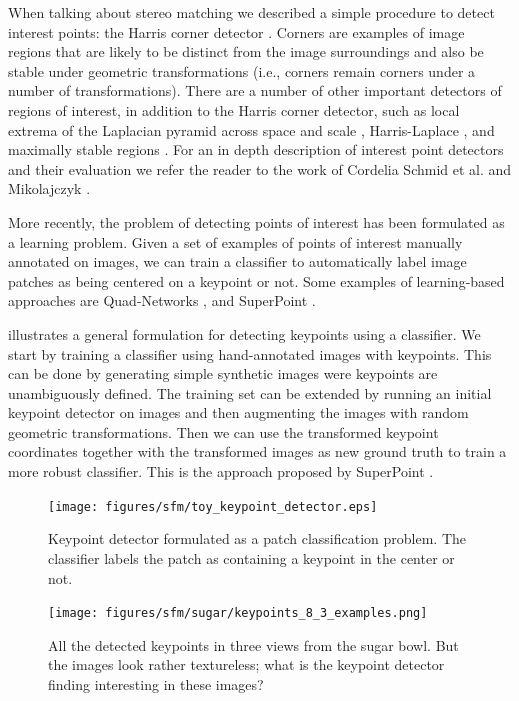 When talking about stereo matching we described a simple procedure to detect interest points: the Harris corner detector \cite{Harris88}. Corners are examples of image regions that are likely to be distinct from the image surroundings and also be stable under geometric transformations (i.e., corners remain corners under a number of transformations).
There are a number of other important detectors of regions of interest, in addition to the Harris corner detector, such as local extrema of the Laplacian pyramid across space and scale \cite{Mikolajczyk2002,Lowe04}, Harris-Laplace \cite{Mikolajczyk2001}, and maximally stable regions \cite{Matas2004}.  For an in depth description of interest point detectors and their evaluation we refer the reader to the work of Cordelia Schmid et al. \cite{Schmid2000} and Mikolajczyk \cite{Mikolajczyk2002}.


More recently, the problem of detecting points of interest has been formulated as a learning problem. Given a set of examples of points of interest manually annotated on images, we can train a classifier to automatically label image patches as being centered on a keypoint or not. Some examples of learning-based approaches are Quad-Networks \cite{Savinov2017}, and SuperPoint \cite{DeTone2018}.


\Fig{\ref{fig:sfm:toy_keypoint_detector}} illustrates a general formulation for detecting keypoints using a classifier. We start by training a classifier using hand-annotated images with keypoints. This can be done by generating simple synthetic images were keypoints are unambiguously defined. The training set can be extended by running an initial keypoint detector on images and then augmenting the images with random geometric transformations. Then we can use the transformed keypoint coordinates together with the transformed images as new ground truth to train a more robust classifier. This is the approach proposed by SuperPoint \cite{DeTone2018}.


\begin{figure}[t]
    \centerline{
        \texttt{[image: figures/sfm/toy\_keypoint\_detector.eps]}
    }
    \caption{Keypoint detector formulated as a patch classification problem. The classifier labels the patch as containing a keypoint in the center or not.}
    \label{fig:sfm:toy_keypoint_detector}
\end{figure}


\begin{figure}[t]
    \centerline{
        \texttt{[image: figures/sfm/sugar/keypoints\_8\_3\_examples.png]}
    }
    \caption{All the detected keypoints in three views from the sugar bowl. But the images look rather textureless; what is the keypoint detector finding interesting in these images?}
    \label{fig:sfm:keypoints_sugar}
\end{figure}

